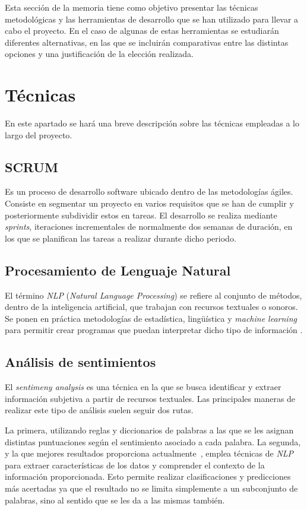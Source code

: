 
Esta sección de la memoria tiene como objetivo presentar las técnicas metodológicas y las herramientas de desarrollo que se han utilizado para llevar a cabo el proyecto. En el caso de algunas de estas herramientas se estudiarán diferentes alternativas, en las que se incluirán comparativas entre las distintas opciones y una justificación de la elección realizada.

\section{Técnicas}

En este apartado se hará una breve descripción sobre las técnicas empleadas a lo largo del proyecto.

\subsection{SCRUM}
Es un proceso de desarrollo software ubicado dentro de las metodologías ágiles. Consiste en segmentar un proyecto en varios requisitos que se han de cumplir y posteriormente subdividir estos en tareas. El desarrollo se realiza mediante \textit{sprints}, iteraciones incrementales de normalmente dos semanas de duración, en los que se planifican las tareas a realizar durante dicho periodo.

\subsection{Procesamiento de Lenguaje Natural}
El término \textit{NLP} (\textit{Natural Language Processing}) se refiere al conjunto de métodos, dentro de la inteligencia artificial, que trabajan con recursos textuales o sonoros. Se ponen en práctica metodologías de estadística, lingüística y \textit{machine learning} para permitir crear programas que puedan interpretar dicho tipo de información \cite{chowdhary2020natural}.

\subsection{Análisis de sentimientos}
El \textit{sentimeny analysis} es una técnica en la que se busca identificar y extraer información subjetiva a partir de recursos textuales. Las principales maneras de realizar este tipo de análisis suelen seguir dos rutas.

La primera, utilizando reglas y diccionarios de palabras a las que se les asignan distintas puntuaciones según el sentimiento asociado a cada palabra. La segunda, y la que mejores resultados proporciona actualmente~\cite{mishev2020evaluation}, emplea técnicas de \textit{NLP} para extraer características de los datos y comprender el contexto de la información proporcionada. Esto permite realizar clasificaciones y predicciones más acertadas ya que el resultado no se limita simplemente a un subconjunto de palabras, sino al sentido que se les da a las mismas también.

